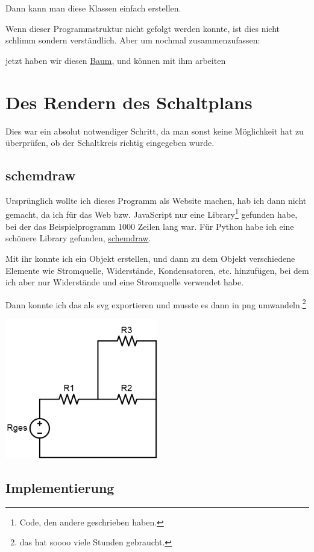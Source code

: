 \documentclass[a4paper,10pt,ngerman]{scrartcl}
\begin{document}
Dann kann man diese Klassen einfach erstellen.

Wenn dieser Programmstruktur nicht gefolgt werden konnte, ist dies nicht schlimm sondern verständlich. Aber um nochmal zusammenzufassen:

jetzt haben wir diesen  \hyperref[subsec:baum]{\underline{Baum}}, und können mit ihm arbeiten

\section{Des Rendern des Schaltplans}

Dies war ein absolut notwendiger Schritt, da man sonst keine Möglichkeit hat zu überprüfen, ob der Schaltkreis richtig eingegeben wurde.

\subsection{schemdraw}

Ursprünglich wollte ich dieses Programm als Website machen, hab ich dann nicht gemacht, da ich für das Web bzw. JavaScript nur eine Library\footnote{Code, den andere geschrieben haben.} gefunden habe,
bei der das Beispielprogramm 1000 Zeilen lang war. Für Python habe ich eine schönere Library gefunden, \href{https://pypi.org/project/schemdraw/}{\underline{schemdraw}}.

Mit ihr konnte ich ein Objekt erstellen, und dann zu dem Objekt verschiedene Elemente wie Stromquelle, Widerstände, Kondensatoren, etc. hinzufügen, bei dem ich aber nur Widerstände und eine Stromquelle verwendet habe.

Dann konnte ich das als svg exportieren und musste es dann in png umwandeln.\footnote{das hat soooo viele Stunden gebraucht.}

\includegraphics[width=0.5\textwidth]{circuit3.png}

\subsection{Implementierung}
\end{document}
